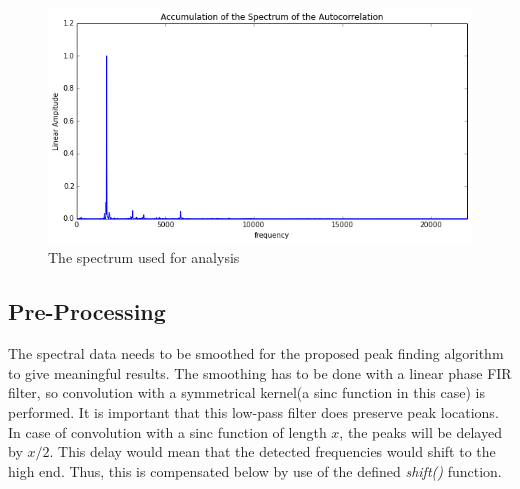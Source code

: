  

       \begin{figure}[h]
           \begin{center}
               \includegraphics[width = 12cm]{BAK4_final_files/BAK4_final_12_1.png}
               \caption{The spectrum used for analysis}
               \label{pySpec}
           \end{center}
       \end{figure}
       
       
              
   
   \subsection{Pre-Processing}
\label{subsec:preprocess} 
    The spectral data needs to be smoothed for the proposed peak
finding algorithm to give meaningful results. The smoothing has to be
done with a linear phase FIR filter, so convolution with a symmetrical
kernel(a sinc function in this case) is performed. It is important that
this low-pass filter does preserve peak locations. In case of convolution with a
sinc function of length \(x\), the peaks will be delayed by \(x/2\). This delay
would mean that the detected frequencies would shift to the high end.
Thus, this is compensated below by use of the defined \textit{shift()}
function.

